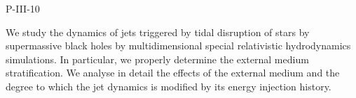 P-III-10


\bigskip



\bigskip

\noindent We study the dynamics of jets triggered by tidal disruption of stars by supermassive black holes by multidimensional special relativistic hydrodynamics simulations. In particular, we properly determine the external medium stratification. We analyse in detail the effects of the external medium and the degree to which the jet dynamics is modified by its energy injection history.

